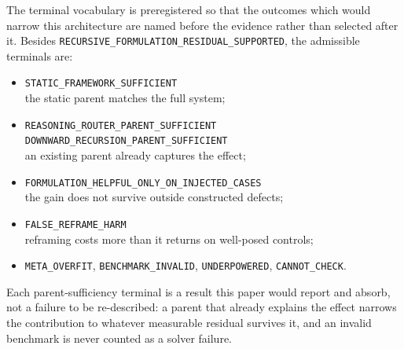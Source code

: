 The terminal vocabulary is preregistered so that the outcomes which would narrow this architecture
are named before the evidence rather than selected after it. Besides
\texttt{RECURSIVE\_FORMULATION\_RESIDUAL\_SUPPORTED}, the admissible terminals are:

\begin{itemize}[leftmargin=2em]
  \item \texttt{STATIC\_FRAMEWORK\_SUFFICIENT}\\
        the static parent matches the full system;
  \item \texttt{REASONING\_ROUTER\_PARENT\_SUFFICIENT}\\
        \texttt{DOWNWARD\_RECURSION\_PARENT\_SUFFICIENT}\\
        an existing parent already captures the effect;
  \item \texttt{FORMULATION\_HELPFUL\_ONLY\_ON\_INJECTED\_CASES}\\
        the gain does not survive outside constructed defects;
  \item \texttt{FALSE\_REFRAME\_HARM}\\
        reframing costs more than it returns on well-posed controls;
  \item \texttt{META\_OVERFIT}, \texttt{BENCHMARK\_INVALID}, \texttt{UNDERPOWERED},
        \texttt{CANNOT\_CHECK}.
\end{itemize}

Each parent-sufficiency terminal is a result this paper would report and absorb, not a failure to
be re-described: a parent that already explains the effect narrows the contribution to whatever
measurable residual survives it, and an invalid benchmark is never counted as a solver failure.

